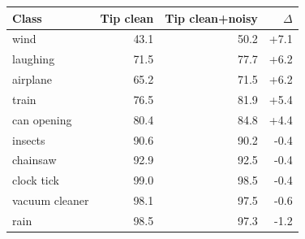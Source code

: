 \begin{tabular}{lrrr}
\toprule
Class & Tip clean & Tip clean+noisy & $\Delta$ \\
\midrule
wind & 43.1 & 50.2 & +7.1 \\
laughing & 71.5 & 77.7 & +6.2 \\
airplane & 65.2 & 71.5 & +6.2 \\
train & 76.5 & 81.9 & +5.4 \\
can opening & 80.4 & 84.8 & +4.4 \\
\midrule
insects & 90.6 & 90.2 & -0.4 \\
chainsaw & 92.9 & 92.5 & -0.4 \\
clock tick & 99.0 & 98.5 & -0.4 \\
vacuum cleaner & 98.1 & 97.5 & -0.6 \\
rain & 98.5 & 97.3 & -1.2 \\
\bottomrule
\end{tabular}